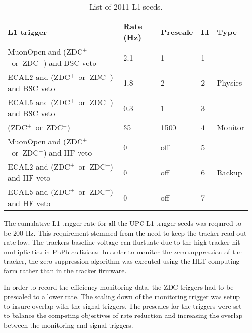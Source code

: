       \begin{table}[h]
        \centering
        \begin{tabular}{|l|l|l|l|l|}
          \hline L1 trigger & Rate (Hz) & Prescale & Id & Type \\ \hline \hline
          MuonOpen and (ZDC$^{+}$~or~ZDC$^{-}$) and BSC veto & 2.1 & 1 & 1 & \multirow{3}{*}{Physics} \\  \hhline{----~}
          ECAL2 and (ZDC$^{+}$~or~ZDC$^{-}$) and BSC veto & 1.8 & 2 & 2 & \\  \hhline{----~}
          ECAL5 and (ZDC$^{+}$~or~ZDC$^{-}$) and BSC veto & 0.3 & 1 & 3 & \\  \hline
          (ZDC$^{+}$~or~ZDC$^{-}$) & 35 & 1500 & 4 & Monitor \\  \hline
          MuonOpen and (ZDC$^{+}$~or~ZDC$^{-}$) and HF veto & 0 & off & 5 & \multirow{3}{*}{Backup} \\ \hhline{----~}
          ECAL2 and (ZDC$^{+}$~or~ZDC$^{-}$) and HF veto & 0 & off & 6 & \\  \hhline{----~}
          ECAL5 and (ZDC$^{+}$~or~ZDC$^{-}$) and HF veto & 0 & off & 7 & \\  \hline
        \end{tabular}
        \caption{List of 2011 L1 seeds.}
        \label{tab:l1Triggers2011}
      \end{table}
      The cumulative L1 trigger rate for all the UPC L1 trigger seeds was
        required to be 200 Hz.
      This requirement stemmed from the need to keep the tracker read-out rate
        low. 
      The trackers baseline voltage can fluctuate due to the high tracker hit 
        multiplicities in PbPb collisions.
      In order to monitor the zero suppression of the tracker, the zero 
        suppression algorithm was executed using the HLT computing farm 
	      rather than in the tracker firmware.

      In order to record the efficiency monitoring data, the ZDC triggers had 
        to be prescaled to a lower rate. 
      The scaling down of the monitoring trigger was setup to insure overlap
        with the signal triggers.
      The prescales for the triggers were set to balance the competing objectives 
        of rate reduction and increasing the overlap between the monitoring and
        signal triggers.

